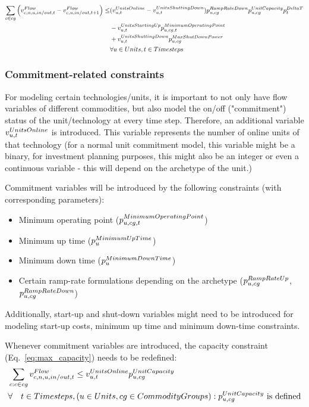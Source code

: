 \begin{align} \label{eq:downdwardrampingconstraintwithcommitmentvariables}
\sum_{\commodity \in cg} \Big( \vFlow - \vFlow[\commodity,\unit,in/out,\timestep+1] \Big) \le &(\vUnitsOnline-\vUnitsShuttingDown) \pRampRateDown \pUnitCapacity \pDeltaT \nonumber \\
& - \vUnitsStartingUp \pMinimumOperatingPoint \nonumber \\
& + \vUnitsShuttingDown \pMaxShutDownPower \nonumber \\
& \forall \units, \timesteps
\end{align}






\subsubsection{Commitment-related constraints}
For modeling certain technologies/units, it is important to not only have flow variables of different commodities, but also model the on/off ("commitment") status of the unit/technology at every time step. Therefore, an additional variable $\vUnitsOnline$ is introduced. This variable represents the number of online units of that technology (for a normal unit commitment model, this variable might be a binary, for investment planning purposes, this might also be an integer or even a continuous variable - this will depend on the archetype of the unit.)

Commitment variables will be introduced by the following constraints (with corresponding parameters):
\begin{itemize}
	\item Minimum operating point ($\pMinimumOperatingPoint$)
	\item Minimum up time ($\pMinimumUpTime$)
	\item Minimum down time ($\pMinimumDownTime$)
	\item Certain ramp-rate formulations depending on the archetype ($\pRampRateUp$, $\pRampRateDown$)
\end{itemize}

Additionally, start-up and shut-down variables might need to be introduced for modeling start-up costs, minimum up time and minimum down-time constraints.

Whenever commitment variables are introduced, the capacity constraint (Eq.~\eqref{eq:max_capacity}) needs to be redefined:
\begin{align} \label{eq:maximumoperatingpoint}
&\sum_{\commodity : \commodity \in \commoditygroup} \vFlow \le \vUnitsOnline \pUnitCapacity \nonumber \\
&\forall \quad \timesteps, (\units, \commoditygroups): \pUnitCapacity \text{ is defined}
\end{align}

